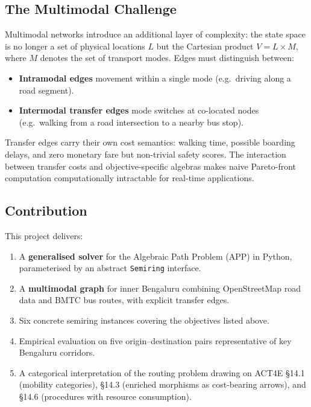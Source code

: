 \documentclass[12pt,a4paper]{article}
\begin{document}
\subsection{The Multimodal Challenge}

Multimodal networks introduce an additional layer of complexity: the
state space is no longer a set of physical locations $L$ but the Cartesian
product $V = L \times M$, where $M$ denotes the set of transport modes.
Edges must distinguish between:
\begin{itemize}[noitemsep]
  \item \textbf{Intramodal edges}  movement within a single mode (e.g.\ driving
        along a road segment).
  \item \textbf{Intermodal transfer edges}  mode switches at co-located nodes
        (e.g.\ walking from a road intersection to a nearby bus stop).
\end{itemize}
Transfer edges carry their own cost semantics: walking time, possible
boarding delays, and zero monetary fare but non-trivial safety scores.
The interaction between transfer costs and objective-specific algebras
makes naive Pareto-front computation computationally intractable for
real-time applications.

\subsection{Contribution}

This project delivers:
\begin{enumerate}[noitemsep]
  \item A \textbf{generalised solver} for the Algebraic Path Problem (APP)
        in Python, parameterised by an abstract \texttt{Semiring} interface.
  \item A \textbf{multimodal graph} for inner Bengaluru combining
        OpenStreetMap road data and BMTC bus routes, with explicit transfer
        edges.
  \item Six concrete semiring instances covering the objectives listed above.
  \item Empirical evaluation on five origin–destination pairs representative
        of key Bengaluru corridors.
  \item A categorical interpretation of the routing problem drawing on
        ACT4E §14.1 (mobility categories), §14.3 (enriched morphisms as
        cost-bearing arrows), and §14.6 (procedures with resource
        consumption).
\end{enumerate}
\end{document}

